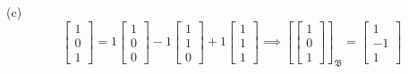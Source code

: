 \documentclass{report}
\begin{document}
(c)
$$
\left[\begin{array}{l} 1 \\ 0 \\ 1 \end{array}\right] =
1\left[\begin{array}{l} 1 \\0 \\ 0 \end{array}\right] -
1\left[\begin{array}{l} 1 \\ 1 \\ 0 \end{array}\right] +
1 \left[\begin{array}{l} 1 \\1 \\ 1 \end{array}\right] \implies
\left[\left[\begin{array}{l} 1 \\0 \\ 1 \end{array}\right]\right]_{\mathfrak{B}} = 
\left[\begin{array}{l} 1 \\ -1 \\ 1 \end{array}\right]
$$
\end{document}
